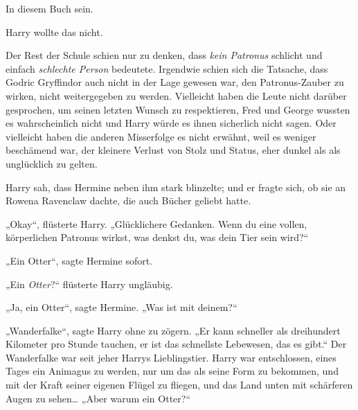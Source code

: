 In diesem Buch sein.

Harry wollte das nicht.

Der Rest der Schule schien nur zu denken, dass \emph{kein Patronus} schlicht und einfach \emph{schlechte Person} bedeutete. Irgendwie schien sich die Tatsache, dass Godric Gryffindor auch nicht in der Lage gewesen war, den Patronus-Zauber zu wirken, nicht weitergegeben zu werden. Vielleicht haben die Leute nicht darüber gesprochen, um seinen letzten Wunsch zu respektieren, Fred und George wussten es wahrscheinlich nicht und Harry würde es ihnen sicherlich nicht sagen. Oder vielleicht haben die anderen Misserfolge es nicht erwähnt, weil es weniger beschämend war, der kleinere Verlust von Stolz und Status, eher dunkel als als unglücklich zu gelten.

Harry sah, dass Hermine neben ihm stark blinzelte; und er fragte sich, ob sie an Rowena Ravenclaw dachte, die auch Bücher geliebt hatte.

„Okay“, flüsterte Harry. „Glücklichere Gedanken. Wenn du eine vollen, körperlichen Patronus wirkst, was denkst du, was dein Tier sein wird?“

„Ein Otter“, sagte Hermine sofort.

„Ein \emph{Otter}?“ flüsterte Harry ungläubig.

„Ja, ein Otter“, sagte Hermine. „Was ist mit deinem?“

„Wanderfalke“, sagte Harry ohne zu zögern. „Er kann schneller als dreihundert Kilometer pro Stunde tauchen, er ist das schnellste Lebewesen, das es gibt.“ Der Wanderfalke war seit jeher Harrys Lieblingstier. Harry war entschlossen, eines Tages ein Animagus zu werden, nur um das als seine Form zu bekommen, und mit der Kraft seiner eigenen Flügel zu fliegen, und das Land unten mit schärferen Augen zu sehen… „Aber warum ein Otter?“

